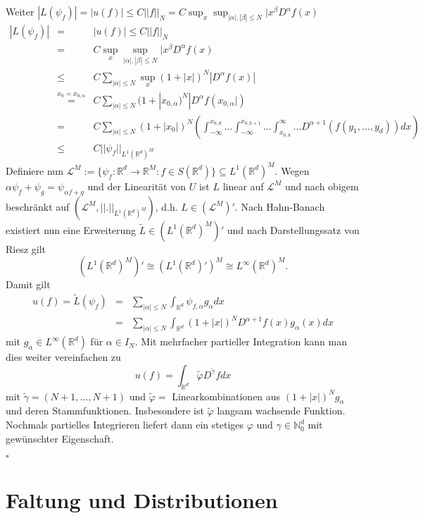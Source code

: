 \documentclass[11pt,a4paper,titlepage, ngerman]{scrartcl}
\numberwithin{equation}{section}
\newcommand{\R}{\mathbb{R}} %
\newcommand{\N}{\mathbb{N}} %
\newcommand{\qed}{\begin{flushright}
		$\square$
	\end{flushright}}
\begin{document}
\begin{enumerate}
		Weiter $|L(\psi_f)| = |u(f)|\leq C||f||_N = C\sup_x \sup_{|\alpha|,|\beta|\leq N}|x^\beta D^\alpha f(x)$
		\begin{eqnarray}
			|L(\psi_f)| &=& |u(f)|\leq C||f||_N\nonumber\\
			&=& C\sup_x \sup_{|\alpha|,|\beta|\leq N}|x^\beta D^\alpha f(x)\nonumber\\
			&\leq & C\sum_{|\alpha|\leq N} \sup_x(1+|x|)^N|D^\alpha f(x)|\nonumber\\
			&\overset{x_0 = x_{0,\alpha}}{=}& C\sum_{|\alpha|\leq N} (1+|x_{0,\alpha})^N|D^\alpha f(x_{0,\alpha}|)\nonumber\\
			&=& C \sum_{|\alpha|\leq N} (1+|x_0|)^N \left( \int_{-\infty}^{x_{0,d}}...\int_{-\infty}^{x_{0,k+1}}...\int_{x_{0,k}}^{\infty}... D^{\alpha+1}(f(y_1,...,y_d))dx  \right)\nonumber\\
			&\leq& C||\psi_f||_{L^1(\R^d)^M}\nonumber
		\end{eqnarray}
		Definiere nun $\mathcal{L}^M:=\{\psi_f:\R^d\rightarrow\R^M: f\in S(\R^d) \}\subseteq L^1(\R^d)^M$. Wegen $\alpha\psi_f+\psi_g = \psi_{\alpha f+g}$ und der Linearität von $U$ ist $L$ linear auf $\mathcal{L}^M$ und nach obigem beschränkt auf $(\mathcal{L}^M,||.||_{L^1(\R^d)^M})$, d.h. $L\in (\mathcal{L}^{M})'$. Nach Hahn-Banach existiert nun eine Erweiterung $\tilde{L}\in (L^1(\R^d)^M)'$ und nach Darstellungssatz von Riesz gilt
		$$(L^1(\R^d)^M)'\cong (L^1(\R^d)')^M\cong L^\infty(\R^d)^M.$$
		Damit gilt 
		\begin{eqnarray}
			u(f) = \tilde{L}(\psi_f) &=& \sum_{|\alpha|\leq N}\int_{\R^d}\psi_{f,\alpha}g_\alpha dx\nonumber\\
			&=&\sum_{|\alpha|\leq N}\int_{\R^d} (1+|x|)^N D^{\alpha + 1}f(x) g_\alpha(x) dx\nonumber
		\end{eqnarray}
		mit $g_\alpha\in L^\infty(\R^d)$ für $\alpha\in I_N$.
		Mit mehrfacher partieller Integration kann man dies weiter vereinfachen zu
		$$u(f) = \int_{\R^d} \tilde{\varphi}D^{\tilde{\gamma}}f dx$$
		mit $\tilde{\gamma} = (N+1,...,N+1)$ und $\tilde{\varphi}=$ Linearkombinationen aus $(1+|x|)^Ng_\alpha$ und deren Stammfunktionen. Insbesondere ist $\tilde{\varphi}$ langsam wachsende Funktion. Nochmals partielles Integrieren liefert dann ein stetiges $\varphi$ und $\gamma\in \N_0^d$ mit gewünschter Eigenschaft.
	\end{enumerate}
	\qed
	
	\section{Faltung und Distributionen}
	
\end{document}
